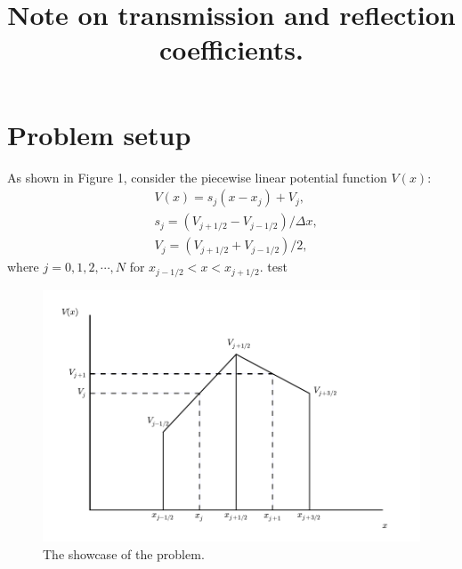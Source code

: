 \documentclass[12pt]{article}       %
\title{Note on transmission and reflection coefficients.}
\author{}
\date{}                         %
\begin{document}
\maketitle
\section{Problem setup}

As shown in Figure 1, consider the piecewise linear potential function $V(x)$:
\begin{align}
    &V(x) = s_j(x - x_j) + V_j, \nonumber \\
    &s_j = (V_{j+1/2} - V_{j-1/2})/\Delta x, \\
    &V_j = (V_{j+1/2} + V_{j-1/2})/2, \nonumber
\end{align}
where $j = 0, 1, 2, \cdots, N$ for $x_{j-1/2} < x < x_{j+1/2}$. test

\begin{figure}[htbp]
    \centering
    \includegraphics{figs/showcase}
    \caption{The showcase of the problem.}
\end{figure}
\end{document}
